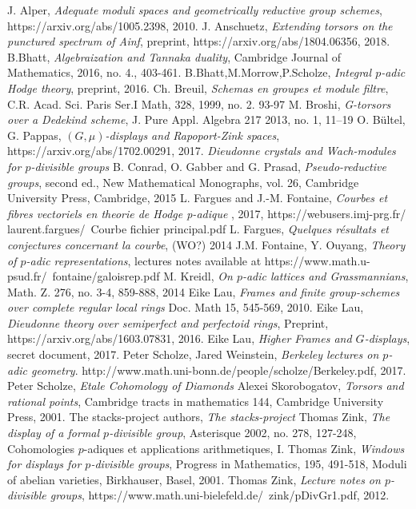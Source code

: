 \documentclass[a4paper,10,5 pt]{amsart}
\theoremstyle{definition}
\begin{document}
\begin{thebibliography}{9}
J. Alper,
\textit{Adequate moduli spaces and geometrically reductive group schemes},
https://arxiv.org/abs/1005.2398,
2010.
J. Anschuetz,
\textit{Extending torsors on the punctured spectrum of Ainf},
preprint, https://arxiv.org/abs/1804.06356,
2018.
B.Bhatt,
\textit{Algebraization and Tannaka duality},
Cambridge Journal of Mathematics,
2016, no. 4., 403-461.
B.Bhatt,M.Morrow,P.Scholze,
\textit{Integral $p$-adic Hodge theory},
preprint, 2016.
Ch. Breuil,
\textit{Schemas en groupes et module filtre},
C.R. Acad. Sci. Paris Ser.I Math, 328,
1999, no. 2. 93-97
M. Broshi,
\textit{G-torsors over a Dedekind scheme},
J. Pure Appl. Algebra 217
2013, no. 1, 11–19 
O. Bültel, G. Pappas,
\textit{$(G,\mu)$-displays and Rapoport-Zink spaces},
https://arxiv.org/abs/1702.00291, 2017.
\textit{Dieudonne crystals and Wach-modules for $p$-divisible groups}
B. Conrad, O. Gabber and G. Prasad,
\textit{Pseudo-reductive groups},
second ed., New Mathematical Monographs, vol. 26,
Cambridge University Press, Cambridge, 2015
L. Fargues and J.-M. Fontaine,
\textit{Courbes et fibres vectoriels en theorie de Hodge
p-adique}
, 2017,
https://webusers.imj-prg.fr/
laurent.fargues/~Courbe
fichier
principal.pdf
L. Fargues,
\textit{Quelques résultats et conjectures concernant la courbe},
(WO?) 2014
J.M. Fontaine, Y. Ouyang,
\textit{Theory of $p$-adic representations},
lectures notes available at https://www.math.u-psud.fr/~fontaine/galoisrep.pdf
M. Kreidl,
\textit{On $p$-adic lattices and Grassmannians},
Math. Z. 276, no. 3-4, 859-888,
2014
Eike Lau,
\textit{Frames and finite group-schemes over complete regular local rings}
Doc. Math 15, 545-569,
2010.
Eike Lau,
\textit{Dieudonne theory over semiperfect and perfectoid rings},
Preprint, https://arxiv.org/abs/1603.07831, 2016.
Eike Lau,
\textit{Higher Frames and $G$-displays}, secret document, 2017.
Peter Scholze, Jared Weinstein, 
\textit{Berkeley lectures on $p$-adic geometry}. 
http://www.math.uni-bonn.de/people/scholze/Berkeley.pdf, 2017.
Peter Scholze,
\textit{Etale Cohomology of Diamonds}
 Alexei Skorobogatov,
 \textit{Torsors and rational points},
 Cambridge tracts in mathematics 144, Cambridge University Press, 2001.
The stacks-project authors,
\textit{The stacks-project} 
Thomas Zink,
\textit{The display of a formal $p$-divisible group}, 
Asterisque 2002, no. 278, 127-248, Cohomologies $p$-adiques et applications arithmetiques, I.
Thomas Zink,
\textit{Windows for displays for $p$-divisible groups},
Progress in Mathematics, 195, 491-518, Moduli of abelian varieties,  Birkhauser, Basel, 2001.
Thomas Zink,
\textit{Lecture notes on $p$-divisible groups},
https://www.math.uni-bielefeld.de/~zink/pDivGr1.pdf, 2012.
\end{thebibliography}
\end{document}
